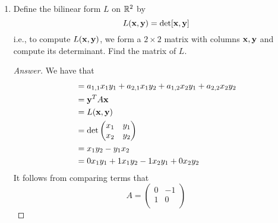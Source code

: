 \documentclass[../psets.tex]{subfiles}
\begin{document}
\begin{enumerate}[label={\textbf{1.\arabic*.}}]
\begin{proof}[Answer]
\begin{align*}
            &= y_1a_{1,1}x_1+y_1a_{1,2}x_2+y_1a_{1,3}x_3+y_2a_{2,1}x_1+y_2a_{2,2}x_2+y_2a_{2,3}x_3+y_3a_{3,1}x_1+y_3a_{3,2}x_2+y_3a_{3,3}x_3\\
            &= a_{1,1}x_1y_1+a_{2,1}x_1y_2+a_{3,1}x_1y_3+a_{1,2}x_2y_1+a_{2,2}x_2y_2+a_{3,2}x_2y_3+a_{1,3}x_3y_1+a_{2,3}x_3y_2+a_{3,3}x_3y_3
        \end{align*}
        It follows from comparing terms that
        \begin{equation*}
            A =
            \begin{pmatrix}
                1 & -5 & 8\\
                2 & 2 & 19\\
                14 & -3 & -2\\
            \end{pmatrix}
        \end{equation*}
    \end{proof}
    \item Define the bilinear form $L$ on $\mathbb{R}^2$ by
    \begin{equation*}
        L(\mathbf{x},\mathbf{y}) = \det[\mathbf{x},\mathbf{y}]
    \end{equation*}
    i.e., to compute $L(\mathbf{x},\mathbf{y})$, we form a $2\times 2$ matrix with columns $\mathbf{x},\mathbf{y}$ and compute its determinant. Find the matrix of $L$.
    \begin{proof}[Answer]
        We have that
        \begin{align*}
            &= a_{1,1}x_1y_1+a_{2,1}x_1y_2+a_{1,2}x_2y_1+a_{2,2}x_2y_2\\
            &= \mathbf{y}^TA\mathbf{x}\\
            &= L(\mathbf{x},\mathbf{y})\\
            &= \det
            \begin{pmatrix}
                x_1 & y_1\\
                x_2 & y_2\\
            \end{pmatrix}\\
            &= x_1y_2-y_1x_2\\
            &= 0x_1y_1+1x_1y_2-1x_2y_1+0x_2y_2
        \end{align*}
        It follows from comparing terms that
        \begin{equation*}
            A =
            \begin{pmatrix}
                0 & -1\\
                1 & 0\\
            \end{pmatrix}

\end{equation*}
\end{proof}
\end{enumerate}
\end{document}

